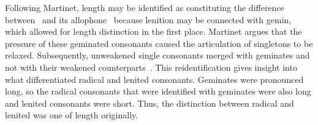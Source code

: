 
Following Martinet, length may be identified as constituting the difference between \xT\ and its \gls{allophone} \lT\  because lenition may be connected with \gls{gemin}, which allowed for length distinction in the first place. Martinet argues that  the pressure of these geminated consonants caused the articulation of singletons to be relaxed. Subsequently, unweakened single consonants merged with geminates and not with their weakened counterparts~\autocite[212]{martinet_celtic_1952}. This reidentification gives insight into what differentiated  radical and lenited consonants. Geminates were pronounced long, so the radical consonants that were identified with geminates were also long and lenited consonants were short. Thus, the distinction between radical and lenited was one of length originally.


